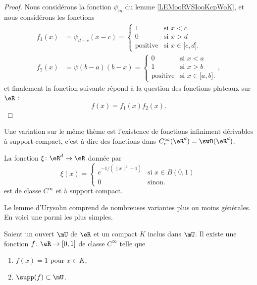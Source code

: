 \begin{proof}
    Nous considérons la fonction \( \psi_m\) du lemme \ref{LEMooRVSIooKcpWoK}, et nous considérons les fonctions
\begin{subequations}
    \begin{align}
        f_1(x)&=\psi_{d-c}(x-c)=\begin{cases}
            1    &   \text{si } x<c\\
            0    &    \text{si } x>d\\
            \text{positive} &\text{si } x\in\mathopen[ c , d \mathclose].
        \end{cases}\\
        f_2(x)&=\psi(b-a)(b-x)=\begin{cases}
            0    &   \text{si } x<a\\
            1    &    \text{si } x>b\\
            \text{positive} &\text{si } x\in \mathopen[ a , b \mathclose].
        \end{cases},
    \end{align}
\end{subequations}
et finalement la fonction suivante répond à la question des fonctions plateaux sur \( \eR\) :
\begin{equation}    \label{EqIHAFooXjfcll}
    f(x)=f_1(x)f_2(x).
\end{equation}
\end{proof}

Une variation sur le même thème est l'existence de fonctions infiniment dérivables à support compact, c'est-à-dire des fonctions dans \(  C^{\infty}_c(\eR^d)=\swD(\eR^d)\). 

\begin{proposition}     \label{PROPooAHLKooMFMgFq}
    La fonction \( \xi\colon \eR^d\to \eR\) donnée par
\begin{equation}    \label{EqOBYNEMu}
    \xi(x)=\begin{cases}
        e^{-1/(\| x \|^2-1)}    &   \text{si } x\in B(0,1)\\
        0    &    \text{sinon}.
    \end{cases}
\end{equation}
est de classe \( C^{\infty}\) et à support compact.
\end{proposition}

Le lemme d'Urysohn comprend de nombreuses variantes plus ou moins générales. En voici une parmi les plus simples.
\begin{lemma}      \label{LEMooECTNooKagaRU}
    Soient un ouvert \( \mU\) de \( \eR\) et un compact \( K\) inclus dans \( \mU\). Il existe une fonction \( f\colon \eR\to \mathopen[ 0 , 1 \mathclose]\) de classe  \(  C^{\infty}\) telle que
    \begin{enumerate}
        \item
            \( f(x)=1\) pour \( x\in K\),
        \item
            \( \supp(f)\subset \mU\).
    \end{enumerate}
\end{lemma}

